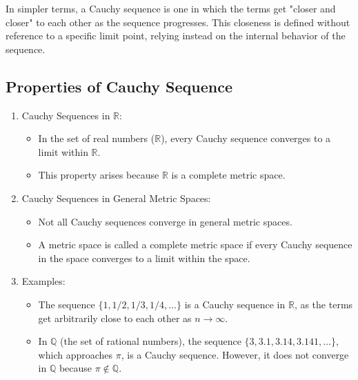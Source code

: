In simpler terms, a Cauchy sequence is one in which the terms get "closer and closer" to each other as the sequence progresses. This closeness is defined without reference to a specific limit point, relying instead on the internal behavior of the sequence.

\subsection{Properties of Cauchy Sequence}
\begin{enumerate}
    \item Cauchy Sequences in \( \mathbb{R} \):
    \begin{itemize}
        \item In the set of real numbers (\( \mathbb{R} \)), every Cauchy sequence converges to a limit within \( \mathbb{R} \).
        \item This property arises because \( \mathbb{R} \) is a complete metric space.
    \end{itemize}

    \item Cauchy Sequences in General Metric Spaces:
    \begin{itemize}
        \item Not all Cauchy sequences converge in general metric spaces.
        \item A metric space is called a complete metric space if every Cauchy sequence in the space converges to a limit within the space.
    \end{itemize}

    \item Examples:
    \begin{itemize}
        \item The sequence \( \{1, 1/2, 1/3, 1/4, \dots\} \) is a Cauchy sequence in \( \mathbb{R} \), as the terms get arbitrarily close to each other as \( n \to \infty \).
        \item In \( \mathbb{Q} \) (the set of rational numbers), the sequence \( \{3, 3.1, 3.14, 3.141, \dots\} \), which approaches \( \pi \), is a Cauchy sequence. However, it does not converge in \( \mathbb{Q} \) because \( \pi \notin \mathbb{Q} \).
    \end{itemize}
\end{enumerate}

